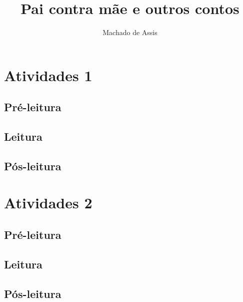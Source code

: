 \documentclass{article}
\begin{document}
\newcommand{\AutorLivro}{Machado de Assis}
\newcommand{\TituloLivro}{Pai contra mãe e outros contos}
\newcommand{\Tema}{Ficção, mistério e fantasia}
\newcommand{\Genero}{Conto, crônica e novela}
\newcommand{\issnppub}{---}
\newcommand{\issnepub}{---}
\newcommand{\colaborador}{\textbf{Fulano de Tal} é uma pessoa incrível e vai fazer um bom serviço.}


\title{\TituloLivro}
\author{\AutorLivro}
\def\authornotes{\colaborador}

\date{}
\maketitle
\tableofcontents




\section{Atividades 1}


\subsection{Pré-leitura}
\subsection{Leitura}
\subsection{Pós-leitura}



\section{Atividades 2}

\subsection{Pré-leitura}
\subsection{Leitura}
\subsection{Pós-leitura}

\lipsum
\end{document}
